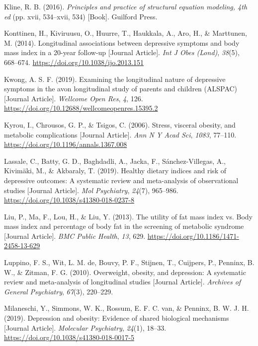 \documentclass[
  letterpaper,
  DIV=11,
  numbers=noendperiod]{scrreport}
\newlength{\cslhangindent}
\newenvironment{CSLReferences}[2] %
 {\begin{list}{}{%
  \setlength{\itemindent}{0pt}
  \setlength{\leftmargin}{0pt}
  \setlength{\parsep}{0pt}
  \ifodd #1
   \setlength{\leftmargin}{\cslhangindent}
   \setlength{\itemindent}{-1\cslhangindent}
  \fi
  \setlength{\itemsep}{#2\baselineskip}}}
 {\end{list}}
\begin{document}
\begin{CSLReferences}{1}{0}
Kline, R. B. (2016). \emph{Principles and practice of structural
equation modeling, 4th ed} (pp. xvii, 534--xvii, 534) {[}Book{]}.
Guilford Press.

Konttinen, H., Kiviruusu, O., Huurre, T., Haukkala, A., Aro, H., \&
Marttunen, M. (2014). Longitudinal associations between depressive
symptoms and body mass index in a 20-year follow-up {[}Journal
Article{]}. \emph{Int J Obes (Lond)}, \emph{38}(5), 668--674.
\url{https://doi.org/10.1038/ijo.2013.151}

Kwong, A. S. F. (2019). Examining the longitudinal nature of depressive
symptoms in the avon longitudinal study of parents and children (ALSPAC)
{[}Journal Article{]}. \emph{Wellcome Open Res}, \emph{4}, 126.
\url{https://doi.org/10.12688/wellcomeopenres.15395.2}

Kyrou, I., Chrousos, G. P., \& Tsigos, C. (2006). Stress, visceral
obesity, and metabolic complications {[}Journal Article{]}. \emph{Ann N
Y Acad Sci}, \emph{1083}, 77--110.
\url{https://doi.org/10.1196/annals.1367.008}

Lassale, C., Batty, G. D., Baghdadli, A., Jacka, F., Sánchez-Villegas,
A., Kivimäki, M., \& Akbaraly, T. (2019). Healthy dietary indices and
risk of depressive outcomes: A systematic review and meta-analysis of
observational studies {[}Journal Article{]}. \emph{Mol Psychiatry},
\emph{24}(7), 965--986. \url{https://doi.org/10.1038/s41380-018-0237-8}

Liu, P., Ma, F., Lou, H., \& Liu, Y. (2013). The utility of fat mass
index vs. Body mass index and percentage of body fat in the screening of
metabolic syndrome {[}Journal Article{]}. \emph{BMC Public Health},
\emph{13}, 629. \url{https://doi.org/10.1186/1471-2458-13-629}

Luppino, F. S., Wit, L. M. de, Bouvy, P. F., Stijnen, T., Cuijpers, P.,
Penninx, B. W., \& Zitman, F. G. (2010). Overweight, obesity, and
depression: A systematic review and meta-analysis of longitudinal
studies {[}Journal Article{]}. \emph{Archives of General Psychiatry},
\emph{67}(3), 220--229.

Milaneschi, Y., Simmons, W. K., Rossum, E. F. C. van, \& Penninx, B. W.
J. H. (2019). Depression and obesity: Evidence of shared biological
mechanisms {[}Journal Article{]}. \emph{Molecular Psychiatry},
\emph{24}(1), 18--33. \url{https://doi.org/10.1038/s41380-018-0017-5}


\end{CSLReferences}
\end{document}
